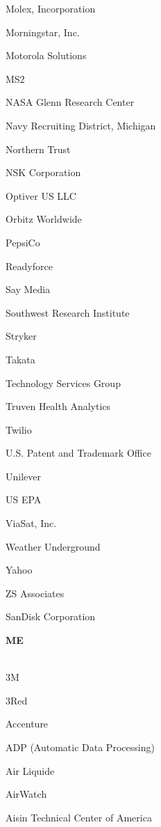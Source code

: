 \documentclass[twoside]{article}
\begin{document}
\begin{center}
\begin{multicols}{5}
\begin{FlushLeft}
\begin{compactitem}
\item Molex, Incorporation
\item Morningstar, Inc.
\item Motorola Solutions
\item MS2
\item NASA Glenn Research Center
\item Navy Recruiting District, Michigan
\item Northern Trust
\item NSK Corporation
\item Optiver US LLC
\item Orbitz Worldwide
\item PepsiCo
\item Readyforce
\item Say Media
\item Southwest Research Institute
\item Stryker
\item Takata
\item Technology Services Group
\item Truven Health Analytics
\item Twilio
\item U.S. Patent and Trademark Office
\item Unilever
\item US EPA
\item ViaSat, Inc.
\item Weather Underground
\item Yahoo
\item ZS Associates
\item SanDisk Corporation
\end{compactitem}
        \end{FlushLeft}
        \vspace{1em}
        {\fontsize{14}{16}\selectfont \bf ME}\\
        \vspace{-1em}
        ~\hrulefill~
        \vspace{-.9em}
        \begin{FlushLeft}
        \begin{compactitem}
        \item 3M
\item 3Red
\item Accenture
\item ADP (Automatic Data Processing)
\item Air Liquide
\item AirWatch
\item Aisin Technical Center of America

\end{compactitem}
\end{FlushLeft}
\end{multicols}
\end{center}
\end{document}
